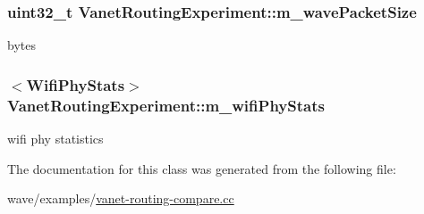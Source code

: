 \subsubsection[{\texorpdfstring{m\+\_\+wave\+Packet\+Size}{m_wavePacketSize}}]{\setlength{\rightskip}{0pt plus 5cm}uint32\+\_\+t Vanet\+Routing\+Experiment\+::m\+\_\+wave\+Packet\+Size\hspace{0.3cm}{\ttfamily [private]}}\hypertarget{classVanetRoutingExperiment_a9f07935713904851763620de8d879134}{}\label{classVanetRoutingExperiment_a9f07935713904851763620de8d879134}


bytes 

\subsubsection[{\texorpdfstring{m\+\_\+wifi\+Phy\+Stats}{m_wifiPhyStats}}]{$<${\bf Wifi\+Phy\+Stats}$>$ Vanet\+Routing\+Experiment\+::m\+\_\+wifi\+Phy\+Stats\hspace{0.3cm}{\ttfamily [private]}}\hypertarget{classVanetRoutingExperiment_a6b7260aa3838c95f5a839d0cea09393f}{}\label{classVanetRoutingExperiment_a6b7260aa3838c95f5a839d0cea09393f}


wifi phy statistics 



The documentation for this class was generated from the following file\+:\begin{DoxyCompactItemize}
\item 
wave/examples/\hyperlink{vanet-routing-compare_8cc}{vanet-\/routing-\/compare.\+cc}\end{DoxyCompactItemize}
